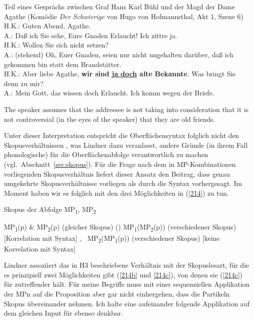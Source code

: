 \begin{exe}
	\ex\label{212} 
	Teil eines Gesprächs zwischen Graf Hans Karl Bühl und der Magd der Dame Agathe (Komödie \textit{Der Schwierige} von Hugo von Hofmannsthal, Akt 1, 			Szene 6)\\
	H.K.: Guten Abend, Agathe.\\
	A.:	Daß ich Sie sehe, Eure Gnaden Erlaucht! Ich zittre ja.\\
	H.K.: Wollen Sie sich nicht setzen?\\
	A.: (stehend) Oh, Euer Gnaden, seien nur nicht ungehalten darüber, daß ich gekommen bin statt dem Brandstätter.\\
	H.K.: Aber liebe Agathe, \textbf{wir sind \underline{ja doch} alte Bekannte}. Was bringt Sie denn zu mir?\\
	A.:	Mein Gott, das wissen doch Erlaucht. Ich komm wegen der Briefe.	
\end{exe}
		
\begin{exe}
	\ex\label{213} 
	The speaker assumes that the addressee is not taking into consideration that it is not 
	controversial (in the eyes of the speaker) that they are old friends. 
	\hfill\hbox{\citet[195]{Lindner1991}}
\end{exe}
Unter dieser Interpretation entspricht die Oberflächensyntax folglich nicht den Skopusverhältnissen , was Lindner dazu veranlasst, andere Gründe (in ihrem Fall phonologische) für die Oberflächenabfolge verantwortlich zu machen (vgl.\ Abschnitt~\ref{sec:skopus}). Für die Frage nach dem in MP-Kom\-bi\-na\-ti\-on\-en vorliegenden Skopusverhältnis liefert dieser Ansatz den Beitrag, dass genau umgekehrte Skopusverhältnisse vorliegen als durch die Syntax vorhergesagt. Im Moment haben wir es folglich mit den drei Möglichkeiten in (\ref{214}) zu tun.
	
\begin{exe}
	\ex\label{214} 
	Skopus der Abfolge MP\textsubscript{1}, MP\textsubscript{2}
		\begin{xlist}	
			\ex\label{214a} MP\textsubscript{1}(\textrm{p}) \& MP\textsubscript{2}(\textrm{p}) (gleicher Skopus) (\citealt{Thurmair1989, Thurmair1991})
			\ex\label{214b} MP\textsubscript{1}(MP\textsubscript{2}(\textrm{p})) (verschiedener Skopus) [\textrm{Korrelation mit Syntax}]
			\newline 
			\hbox{}\hfill\hbox{\citet{Ormelius-Sandblom1997}, \citet{Rinas2007}}
			\ex\label{214c} MP\textsubscript{2}(MP\textsubscript{1}(\textrm{p})) (verschiedener Skopus) [\textrm{keine Korrelation mit Syntax}]
			\newline
			\hbox{}\hfill\hbox{\citet{Lindner1991}}		
		\end{xlist}	
\end{exe}
Lindner assoziiert das in H3 beschriebene Verhältnis mit der Skopuslesart, für die es prinzipiell zwei Möglichkeiten gibt (\ref{214b} und \ref{214c}), von denen sie (\ref{214c}) für zutreffender hält. Für meine Begriffe muss mit einer sequenziellen Applikation der MPn auf die Proposition aber gar nicht einhergehen, dass die Partikeln Skopus übereinander nehmen. Ich halte eine aufeinander folgende Applikation auf dem gleichen Input für ebenso denkbar.\largerpage[2]

